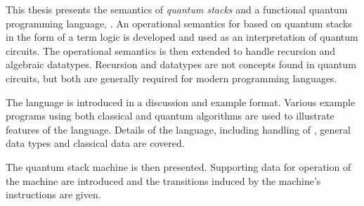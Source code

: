 This  thesis presents the semantics of \emph{quantum stacks} and 
 a functional quantum programming language, \lqpl{}. 
An operational semantics for \lqpl{} based on quantum
stacks in the form of a term logic is developed and used
as an interpretation of quantum circuits.  The operational
semantics is then extended to handle recursion and algebraic datatypes.
Recursion and datatypes are not concepts  found in quantum 
circuits, but both  are generally required for 
modern programming languages.

The language \lqpl{}  is introduced in a 
discussion and example format. Various example programs using both
classical and 
quantum algorithms are used to illustrate features of the language. 
Details of the language,
including handling of \qbits, general data types and classical data
are covered. 

The quantum stack machine is then presented. 
Supporting data for operation of the  machine are introduced
and the transitions induced by the machine's instructions are given.

